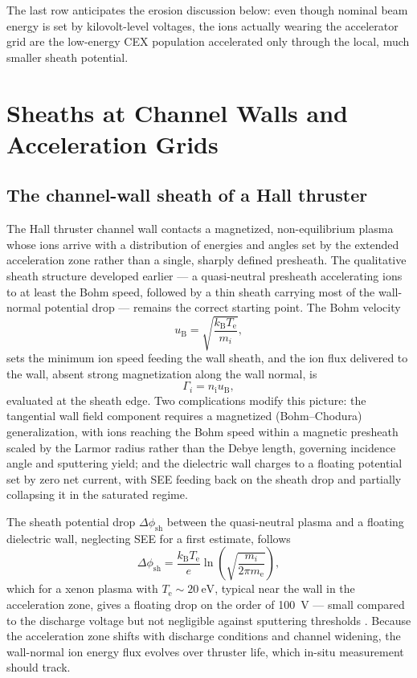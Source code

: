 The last row anticipates the erosion discussion below: even though nominal beam energy is set by kilovolt-level voltages, the ions actually wearing the accelerator grid are the low-energy CEX population accelerated only through the local, much smaller sheath potential.

\section{Sheaths at Channel Walls and Acceleration Grids}
\label{sec:ep-sheaths}

\subsection{The channel-wall sheath of a Hall thruster}

The Hall thruster channel wall contacts a magnetized, non-equilibrium plasma whose ions arrive with a distribution of energies and angles set by the extended acceleration zone rather than a single, sharply defined presheath. The qualitative sheath structure developed earlier — a quasi-neutral presheath accelerating ions to at least the Bohm speed, followed by a thin sheath carrying most of the wall-normal potential drop — remains the correct starting point. The Bohm velocity
\begin{equation}
u_{\mathrm{B}} = \sqrt{\frac{k_{\mathrm{B}} T_{\mathrm{e}}}{m_i}},
\label{ch16-eq:bohm}
\end{equation}
sets the minimum ion speed feeding the wall sheath, and the ion flux delivered to the wall, absent strong magnetization along the wall normal, is
\begin{equation}
\Gamma_i = n_{\mathrm{i}} u_{\mathrm{B}},
\label{eq:gammai}
\end{equation}
evaluated at the sheath edge. Two complications modify this picture: the tangential wall field component requires a magnetized (Bohm–Chodura) generalization, with ions reaching the Bohm speed within a magnetic presheath scaled by the Larmor radius rather than the Debye length, governing incidence angle and sputtering yield; and the dielectric wall charges to a floating potential set by zero net current, with SEE feeding back on the sheath drop and partially collapsing it in the saturated regime.

The sheath potential drop $\Delta\phi_{\mathrm{sh}}$ between the quasi-neutral plasma and a floating dielectric wall, neglecting SEE for a first estimate, follows
\begin{equation}
\Delta\phi_{\mathrm{sh}} = \frac{k_{\mathrm{B}} T_{\mathrm{e}}}{e}\ln\!\left(\sqrt{\frac{m_i}{2\pi m_{\mathrm{e}}}}\right),
\label{eq:floatpot}
\end{equation}
which for a xenon plasma with $T_{\mathrm{e}}\sim\SI{20}{\electronvolt}$, typical near the wall in the acceleration zone, gives a floating drop on the order of 100~V — small compared to the discharge voltage but not negligible against sputtering thresholds \cite{ref0425}. Because the acceleration zone shifts with discharge conditions and channel widening, the wall-normal ion energy flux evolves over thruster life, which in-situ measurement should track.

